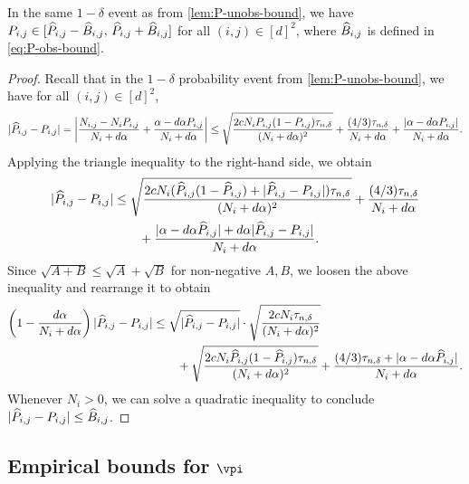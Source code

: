 \begin{lemma}
  \label{lem:P-obs-bound}
  In the same $1-\delta$ event as from \cref{lem:P-unobs-bound},
  we have
  $P_{i,j} \in [ \widehat{P}_{i,j} - \widehat{B}_{i,j},\, \widehat{P}_{i,j}
  + \widehat{B}_{i,j} ]$
  for all $(i,j) \in [d]^2$,
  where $\widehat{B}_{i,j}$ is defined in \cref{eq:P-obs-bound}.
\end{lemma}
\begin{proof}
  Recall that in the $1-\delta$ probability event from
  \cref{lem:P-unobs-bound}, we have for all $(i,j) \in [d]^2$,
  \begin{multline*}
    \abs{ \wh{P}_{i,j} - P_{i,j} }
    =
    \Abs{
      \frac{N_{i,j} - N_i P_{i,j}}{N_i + d\alpha}
      + \frac{\alpha - d\alpha P_{i,j}}{N_i + d\alpha}
    } %
    \leq
    \sqrt{\frac{2cN_iP_{i,j}(1-P_{i,j})\emptail}{(N_i+d\alpha)^2}}
    + \frac{(4/3)\emptail}{N_i+d\alpha}
    + \frac{\abs{\alpha-d\alpha P_{i,j}}}{N_i+d\alpha}
    .
  \end{multline*}
  Applying the triangle inequality to the right-hand side, we obtain
  \begin{align}
    | \widehat{P}_{i,j} - P_{i,j} |
    & \leq
    \sqrt{
      \frac{
        2cN_i(
          \widehat{P}_{i,j}(1-\widehat{P}_{i,j})
          + |\widehat{P}_{i,j} - P_{i,j}|
        ) \tau_{n,\delta}
      }{(N_i+d\alpha)^2}
    }
    + \frac{(4/3)\tau_{n,\delta}}{N_i+d\alpha}
    \notag \\
    & \qquad
    + \frac{
      |\alpha-d\alpha \widehat{P}_{i,j}|
      + d\alpha|\widehat{P}_{i,j}-P_{i,j}|
    }{N_i+d\alpha}
    .
    \notag
  \end{align}
  Since $\sqrt{A+B} \leq \sqrt{A} + \sqrt{B}$ for non-negative $A,B$, we
  loosen the above inequality and rearrange it to obtain
  \begin{align*}
    \left( 1 - \frac{d\alpha}{N_i+d\alpha} \right)
    |\widehat{P}_{i,j} - P_{i,j}|
    & \leq
    \sqrt{|\widehat{P}_{i,j} - P_{i,j}|} \cdot
    \sqrt{\frac{2cN_i\tau_{n,\delta}}{(N_i+d\alpha)^2}}
    \\
    & \qquad
    +
    \sqrt{\frac{2cN_i\widehat{P}_{i,j}(1-\widehat{P}_{i,j})\tau_{n,\delta}}{(N_i+d\alpha)^2}}
    + \frac{(4/3)\tau_{n,\delta} + |\alpha -
    d\alpha\widehat{P}_{i,j}|}{N_i+d\alpha}
    .
  \end{align*}
  Whenever $N_i > 0$, we can solve a quadratic inequality to conclude
  $|\widehat{P}_{i,j}-P_{i,j}| \leq \widehat{B}_{i,j}$.
\end{proof}

\subsection{Empirical bounds for $\vpi$}

